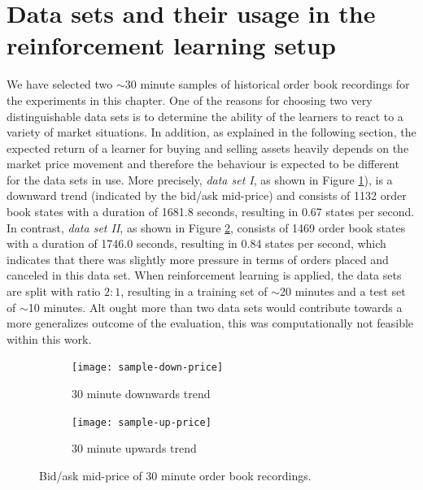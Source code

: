 \section{Data sets and their usage in the reinforcement learning setup}
\label{sec:analysis-data-sets}
We have selected two $\sim$30 minute samples of historical order book recordings for the experiments in this chapter.
One of the reasons for choosing two very distinguishable data sets is to determine the ability of the learners to react to a variety of market situations.
In addition, as explained in the following section, the expected return of a learner for buying and selling assets heavily depends on the market price movement and therefore the behaviour is expected to be different for the data sets in use.
More precisely, \textit{data set I}, as shown in Figure \ref{fig:sample-down-price}), is a downward trend (indicated by the bid/ask mid-price) and consists of 1132 order book states with a duration of 1681.8 seconds, resulting in 0.67 states per second.
In contrast, \textit{data set II}, as shown in Figure \ref{fig:sample-up-price}, consists of 1469 order book states with a duration of 1746.0 seconds, resulting in 0.84 states per second, which indicates that there was slightly more pressure in terms of orders placed and canceled in this data set.
When reinforcement learning is applied, the data sets are split with ratio $2:1$, resulting in a training set of $\sim$20 minutes and a test set of $\sim$10 minutes.
Alt ought more than two data sets would contribute towards a more generalizes outcome of the evaluation, this was computationally not feasible within this work.
\begin{figure}[H]
    \centering
    \begin{subfigure}[b]{0.45\textwidth}
        \texttt{[image: sample-down-price]}
        \caption{30 minute downwards trend}
        \label{fig:sample-down-price}
    \end{subfigure}
    \begin{subfigure}[b]{0.45\textwidth}
        \texttt{[image: sample-up-price]}
        \caption{30 minute upwards trend}
        \label{fig:sample-up-price}
    \end{subfigure}
    \caption{Bid/ask mid-price of 30 minute order book recordings.}
    \label{fig:sample-price}
\end{figure}


